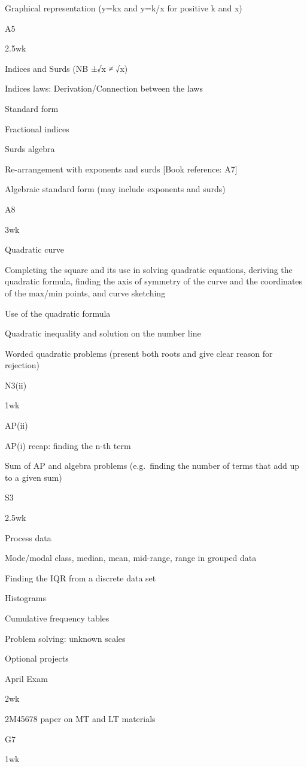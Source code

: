 \documentclass[
]{article}
\begin{document}
Graphical representation (y=kx and y=k/x for positive k and x)

A5

2.5wk

Indices and Surds (NB ±√x ≠ √x)

Indices laws: Derivation/Connection between the laws

Standard form

Fractional indices

Surds algebra

Re-arrangement with exponents and surds {[}Book reference: A7{]}

Algebraic standard form (may include exponents and surds)

A8

3wk

Quadratic curve

Completing the square and its use in solving quadratic equations,
deriving the quadratic formula, finding the axis of symmetry of the
curve and the coordinates of the max/min points, and curve sketching

Use of the quadratic formula

Quadratic inequality and solution on the number line

Worded quadratic problems (present both roots and give clear reason for
rejection)

N3(ii)

1wk

AP(ii)

AP(i) recap: finding the n-th term

Sum of AP and algebra problems (e.g.~finding the number of terms that
add up to a given sum)

S3

2.5wk

Process data

Mode/modal class, median, mean, mid-range, range in grouped data

Finding the IQR from a discrete data set

Histograms

Cumulative frequency tables

Problem solving: unknown scales

Optional projects

April Exam

2wk

2M45678 paper on MT and LT materials

G7

1wk
\end{document}
